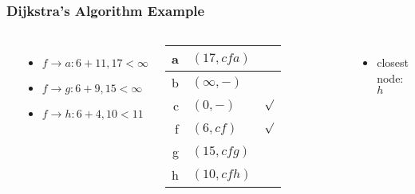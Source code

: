 \documentclass[dvipsnames]{beamer}
\begin{document}
\begin{frame}
  \frametitle{Dijkstra's Algorithm Example}

  \begin{example}[from node $f$ - base distance=$6$]
    \begin{columns}
      \begin{center}
      \end{center}

      \begin{itemize}
        \item $f \rightarrow a: 6+11, 17 < \infty$
        \item $f \rightarrow g: 6+9, 15 < \infty$
        \item $f \rightarrow h: 6+4, 10 < 11$
      \end{itemize}

      \pause
      \begin{table}
        \begin{tabular}{r|l|c}
          a & $(17,cfa)$   & \\\hline
          b & $(\infty,-)$ & \\\hline
          c & $(0,-)$      & $\surd$ \\\hline
          f & $(6,cf)$     & $\surd$ \\\hline
          g & $(15,cfg)$   & \\\hline
          h & $(10,cfh)$   &
        \end{tabular}
      \end{table}

      \pause
      \begin{itemize}
        \item closest node: $h$
      \end{itemize}
    \end{columns}
  \end{example}
\end{frame}
\end{document}

